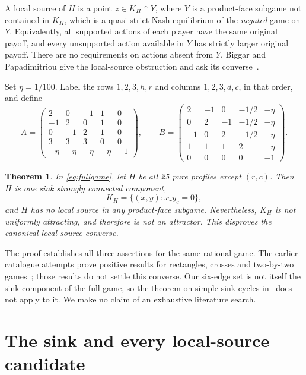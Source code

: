 \documentclass[11pt,a4paper]{article}
\numberwithin{equation}{section}
\newtheorem{theorem}{Theorem}
\theoremstyle{definition}
\begin{document}
A local source of \(H\) is a point \(z\in K_H\cap Y\), where \(Y\)
is a product-face subgame not contained in \(K_H\), which is a
quasi-strict Nash equilibrium of the \emph{negated} game on \(Y\).
Equivalently, all supported actions of each player have the same
original payoff, and every unsupported action available in \(Y\) has
strictly larger original payoff. There are no requirements on actions
absent from \(Y\). Biggar and Papadimitriou give the local-source
obstruction and ask its converse~\cite[Definition 2.1, Lemma 2.2,
Section 4]{BP}.

Set \(\eta=1/100\). Label the rows \(1,2,3,h,r\) and columns
\(1,2,3,d,c\), in that order, and define
\begin{equation}\label{eq:fullgame}
 A=\begin{pmatrix}
 2&0&-1&1&0\\
 -1&2&0&1&0\\
 0&-1&2&1&0\\
 3&3&3&0&0\\
 -\eta&-\eta&-\eta&-\eta&-1
 \end{pmatrix},\qquad
 B=\begin{pmatrix}
 2&-1&0&-1/2&-\eta\\
 0&2&-1&-1/2&-\eta\\
 -1&0&2&-1/2&-\eta\\
 1&1&1&2&-\eta\\
 0&0&0&0&-1
 \end{pmatrix}.
\end{equation}

\begin{theorem}\label{thm:main}
In \eqref{eq:fullgame}, let \(H\) be all 25 pure profiles except
\((r,c)\). Then \(H\) is one sink strongly connected component,
\[
 K_H=\{(x,y):x_r y_c=0\},
\]
and \(H\) has no local source in any product-face subgame. Nevertheless,
\(K_H\) is not uniformly attracting, and therefore is not an attractor.
This disproves the canonical local-source converse.
\end{theorem}

The proof establishes all three assertions for the same rational game.
The earlier catalogue attempts prove positive results for rectangles,
crosses and two-by-two games~\cite{prior1,prior2}; those results do not
settle this converse. Our six-edge set is not itself the sink component
of the full game, so the theorem on simple sink cycles in~\cite{cycles}
does not apply to it. We make no claim of an exhaustive literature search.

\section{The sink and every local-source candidate}\label{sec:sources}
\end{document}
